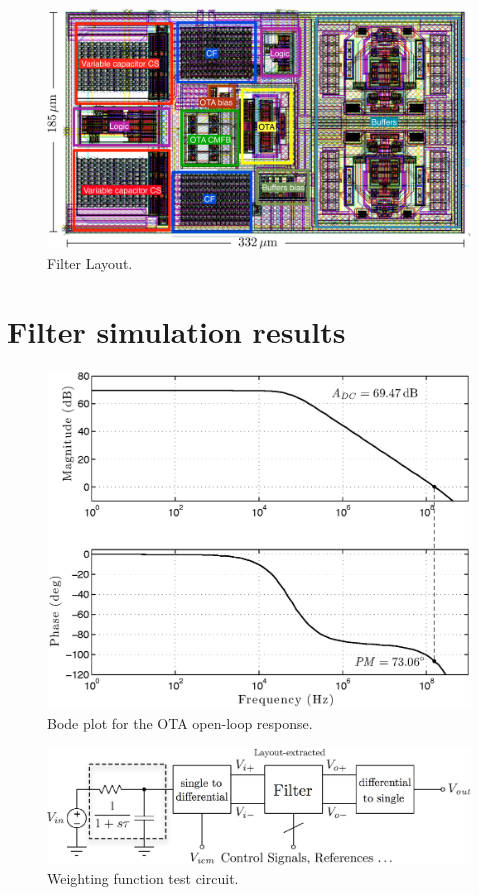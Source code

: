 \begin{figure}[!t]
	\centering
	\includegraphics[width=6in]{./Figures/filter_layout}
	\caption{Filter Layout.}\label{fig:filter layout}
\end{figure}



\section{Filter simulation results}


\begin{figure}[!t]
	\centering
	\includegraphics[width=5.3in]{./Test/bode_OTA_post}
	\caption{Bode plot for the OTA open-loop response.}\label{fig:bode_OTA}
\end{figure}

\begin{figure}[!t]
	\centering
	\includegraphics[width=5in]{./Test/wf_test_circuit}
	\caption{Weighting function test circuit.}\label{fig:wf_test_circuit}
\end{figure}

